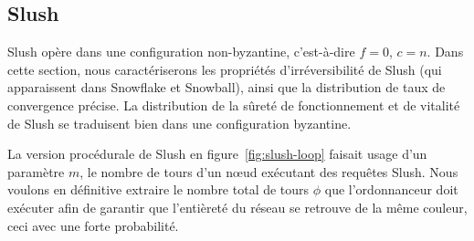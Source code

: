 \documentclass[a4,twocolumn,10pt]{article}
\theoremstyle{definition}
\begin{document}
\begin{appendices}
\subsection{Slush}
Slush opère dans une configuration non-byzantine, c'est-à-dire $f = 0$, $c = n$.
Dans cette section, nous caractériserons les propriétés d'irréversibilité de Slush (qui apparaissent dans Snowflake et Snowball), ainsi que la distribution de taux de convergence précise. La distribution de la sûreté de fonctionnement et de vitalité de Slush se traduisent bien dans une configuration byzantine.


La version procédurale de Slush en figure~\ref{fig:slush-loop} faisait usage d'un paramètre $m$, le nombre de tours d'un nœud exécutant des requêtes Slush.
Nous voulons en définitive extraire le nombre total de tours $\phi$ que l'ordonnanceur doit exécuter afin de garantir que l'entièreté du réseau se retrouve de la même couleur, ceci avec une forte probabilité.


\end{appendices}
\end{document}
